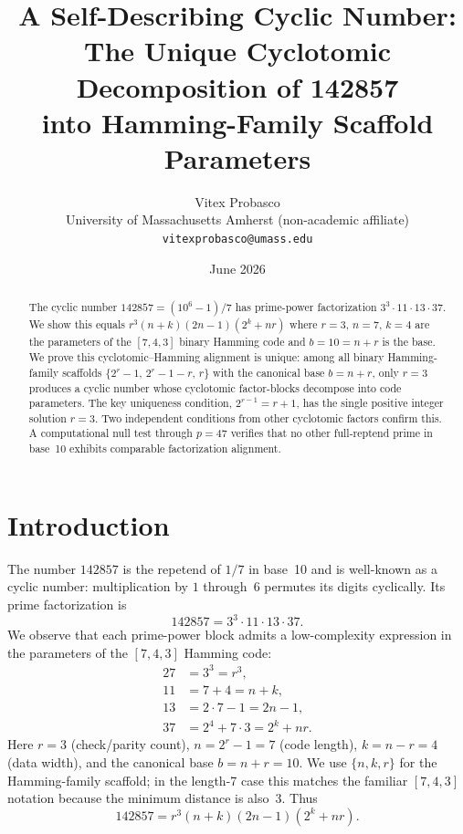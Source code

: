 \documentclass[11pt]{article}
\title{A Self-Describing Cyclic Number:\\
The Unique Cyclotomic Decomposition of 142857\\
into Hamming-Family Scaffold Parameters}
\author{Vitex Probasco\\
\small University of Massachusetts Amherst (non-academic affiliate)\\
\small \texttt{vitexprobasco@umass.edu}}
\date{June 2026}
\theoremstyle{definition}
\theoremstyle{remark}
\begin{document}
\maketitle

\begin{abstract}
The cyclic number $142857 = (10^6-1)/7$ has prime-power factorization
$3^3 \cdot 11 \cdot 13 \cdot 37$. We show this equals
$r^3(n+k)(2n-1)(2^k+nr)$ where $r=3$, $n=7$, $k=4$ are the parameters
of the $[7,4,3]$ binary Hamming code and $b=10=n+r$ is the base.
We prove this cyclotomic--Hamming alignment is unique: among all binary
Hamming-family scaffolds $\{2^r-1,\,2^r-1-r,\,r\}$ with the canonical base
$b=n+r$, only $r=3$ produces a cyclic number whose cyclotomic
factor-blocks decompose into code parameters. The key uniqueness
condition, $2^{r-1}=r+1$, has the single positive integer solution
$r=3$. Two independent conditions from other cyclotomic factors
confirm this. A computational null test through $p=47$ verifies that
no other full-reptend prime in base~10 exhibits comparable
factorization alignment.
\end{abstract}

\section{Introduction}

The number $142857$ is the repetend of $1/7$ in base~10 and is
well-known as a cyclic number: multiplication by $1$ through~$6$
permutes its digits cyclically. Its prime factorization is
\[
142857 = 3^3 \cdot 11 \cdot 13 \cdot 37.
\]
We observe that each prime-power block admits a low-complexity
expression in the parameters of the $[7,4,3]$ Hamming code:
\begin{align}
27 &= 3^3 = r^3, \label{eq:27}\\
11 &= 7+4 = n+k, \label{eq:11}\\
13 &= 2\cdot 7-1 = 2n-1, \label{eq:13}\\
37 &= 2^4+7\cdot 3 = 2^k+nr. \label{eq:37}
\end{align}
Here $r=3$ (check/parity count), $n=2^r-1=7$ (code length),
$k=n-r=4$ (data width), and the canonical base $b=n+r=10$.
We use $\{n,k,r\}$ for the Hamming-family scaffold; in the
length-7 case this matches the familiar $[7,4,3]$ notation
because the minimum distance is also~$3$. Thus
\begin{equation}\label{eq:main}
142857 = r^3(n+k)(2n-1)(2^k+nr).
\end{equation}
\end{document}
